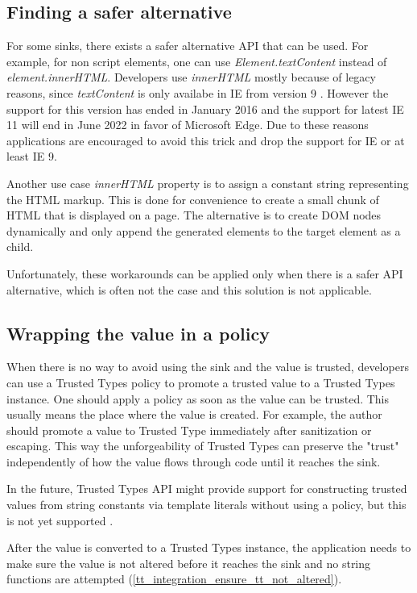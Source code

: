 \subsection{Finding a safer alternative}

For some sinks, there exists a safer alternative API that can be used. For example, for non script
elements, one can use \emph{Element.textContent} instead of \emph{element.innerHTML}. Developers use
\emph{innerHTML} mostly because of legacy reasons, since \emph{textContent} is only availabe in IE
from version 9 \cite{text_content_mdn}. However the support for this version has ended in January
2016 and the support for latest IE 11 will end in June 2022 in favor of Microsoft Edge. Due to these
reasons applications are encouraged to avoid this trick and drop the support for IE or at least IE
9.

Another use case \emph{innerHTML} property is to assign a constant string representing the HTML
markup. This is done for convenience to create a small chunk of HTML that is displayed on a page.
The alternative is to create DOM nodes dynamically and only append the generated elements to the
target element as a child.

Unfortunately, these workarounds can be applied only when there is a safer API alternative, which is
often not the case and this solution is not applicable.

\subsection{Wrapping the value in a policy}

When there is no way to avoid using the sink and the value is trusted, developers can use a Trusted
Types policy to promote a trusted value to a Trusted Types instance. One should apply a policy as
soon as the value can be trusted. This usually means the place where the value is created. For
example, the author should promote a value to Trusted Type immediately after sanitization or
escaping. This way the unforgeability of Trusted Types can preserve the "trust" independently of how
the value flows through code until it reaches the sink.

In the future, Trusted Types API might provide support for constructing trusted values from string
constants via template literals without using a policy, but this is not yet supported
\cite{tt_from_literal_method}.

After the value is converted to a Trusted Types instance, the application needs to make sure the
value is not altered before it reaches the sink and no string functions are attempted
(\ref{tt_integration_ensure_tt_not_altered}).


